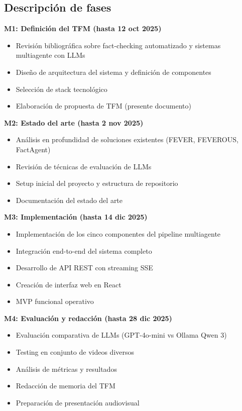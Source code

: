 \documentclass[12pt,a4paper]{article}
\begin{document}
\subsection{Descripción de fases}

\textbf{M1: Definición del TFM (hasta 12 oct 2025)}
\begin{itemize}
    \item Revisión bibliográfica sobre fact-checking automatizado y sistemas multiagente con LLMs
    \item Diseño de arquitectura del sistema y definición de componentes
    \item Selección de stack tecnológico
    \item Elaboración de propuesta de TFM (presente documento)
\end{itemize}

\textbf{M2: Estado del arte (hasta 2 nov 2025)}
\begin{itemize}
    \item Análisis en profundidad de soluciones existentes (FEVER, FEVEROUS, FactAgent)
    \item Revisión de técnicas de evaluación de LLMs
    \item Setup inicial del proyecto y estructura de repositorio
    \item Documentación del estado del arte
\end{itemize}

\textbf{M3: Implementación (hasta 14 dic 2025)}
\begin{itemize}
    \item Implementación de los cinco componentes del pipeline multiagente
    \item Integración end-to-end del sistema completo
    \item Desarrollo de API REST con streaming SSE
    \item Creación de interfaz web en React
    \item MVP funcional operativo
\end{itemize}

\textbf{M4: Evaluación y redacción (hasta 28 dic 2025)}
\begin{itemize}
    \item Evaluación comparativa de LLMs (GPT-4o-mini vs Ollama Qwen 3)
    \item Testing en conjunto de videos diversos
    \item Análisis de métricas y resultados
    \item Redacción de memoria del TFM
    \item Preparación de presentación audiovisual
\end{itemize}
\end{document}
